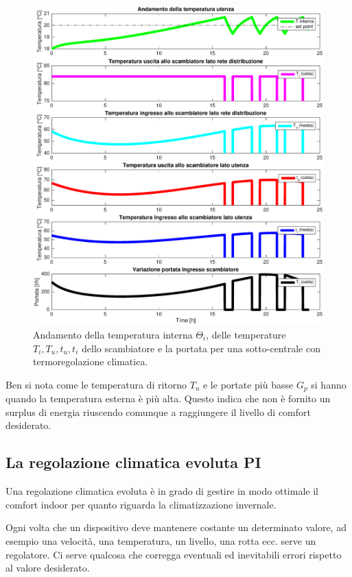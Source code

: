 \documentclass[laurea,oneside,11pt]{USiena_tesiLM}
\begin{document}
\begin{figure}[!ht]
\centering
\includegraphics[width=\textwidth]{figure/reg_climatica} 
\caption{Andamento della temperatura interna $\Theta_i$, delle temperature $T_i, T_u, t_u, t_i$ dello scambiatore e la portata per una sotto-centrale con termoregolazione climatica.}
\label{fig:reg_climatica}
\end{figure}

Ben si nota come le temperatura di ritorno $T_u$ e le portate più basse  $G_p$ si hanno quando la temperatura esterna è più alta. Questo indica che non è fornito un surplus di energia riuscendo comunque a raggiungere il livello di comfort desiderato.

\subsection{La regolazione climatica evoluta PI}
Una regolazione climatica evoluta è in grado di gestire in modo ottimale il comfort indoor per quanto riguarda la climatizzazione invernale.

Ogni volta che un dispositivo deve mantenere costante un determinato valore, ad esempio una velocità, una temperatura, un livello, una rotta ecc. serve un regolatore. Ci serve qualcosa che corregga eventuali ed inevitabili errori rispetto al valore desiderato.
 
\end{document}
